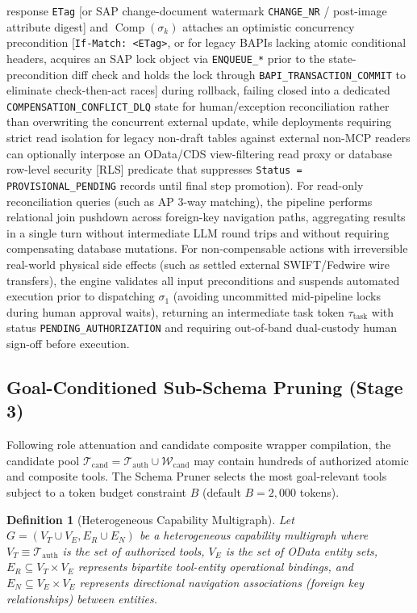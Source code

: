 \documentclass[conference,10pt]{IEEEtran}
\newtheorem{definition}{Definition}
\begin{document}
response \texttt{ETag} [or SAP change-document watermark \texttt{CHANGE\_NR} / post-image attribute digest] and $\operatorname{Comp}(\sigma_k)$ attaches an optimistic concurrency precondition [\texttt{If-Match: <ETag>}, or for legacy BAPIs lacking atomic conditional headers, acquires an SAP lock object via \texttt{ENQUEUE\_*} prior to the state-precondition diff check and holds the lock through \texttt{BAPI\_TRANSACTION\_COMMIT} to eliminate check-then-act races] during rollback, failing closed into a dedicated \texttt{COMPENSATION\_CONFLICT\_DLQ} state for human/exception reconciliation rather than overwriting the concurrent external update, while deployments requiring strict read isolation for legacy non-draft tables against external non-MCP readers can optionally interpose an OData/CDS view-filtering read proxy or database row-level security [RLS] predicate that suppresses \texttt{Status = PROVISIONAL\_PENDING} records until final step promotion). For read-only reconciliation queries (such as AP 3-way matching), the pipeline performs relational join pushdown across foreign-key navigation paths, aggregating results in a single turn without intermediate LLM round trips and without requiring compensating database mutations. For non-compensable actions with irreversible real-world physical side effects (such as settled external SWIFT/Fedwire wire transfers), the engine validates all input preconditions and suspends automated execution prior to dispatching $\sigma_1$ (avoiding uncommitted mid-pipeline locks during human approval waits), returning an intermediate task token $\tau_{\text{task}}$ with status \texttt{PENDING\_AUTHORIZATION} and requiring out-of-band dual-custody human sign-off before execution.

\subsection{Goal-Conditioned Sub-Schema Pruning (Stage 3)}
Following role attenuation and candidate composite wrapper compilation, the candidate pool $\mathcal{T}_{\text{cand}} = \mathcal{T}_{\text{auth}} \cup \mathcal{W}_{\text{cand}}$ may contain hundreds of authorized atomic and composite tools. The Schema Pruner selects the most goal-relevant tools subject to a token budget constraint $B$ (default $B = 2{,}000$ tokens).

\begin{definition}[Heterogeneous Capability Multigraph]
Let $G = (V_T \cup V_E, E_R \cup E_N)$ be a heterogeneous capability multigraph where $V_T \equiv \mathcal{T}_{\text{auth}}$ is the set of authorized tools, $V_E$ is the set of OData entity sets, $E_R \subseteq V_T \times V_E$ represents bipartite tool-entity operational bindings, and $E_N \subseteq V_E \times V_E$ represents directional navigation associations (foreign key relationships) between entities.
\end{definition}
\end{document}
